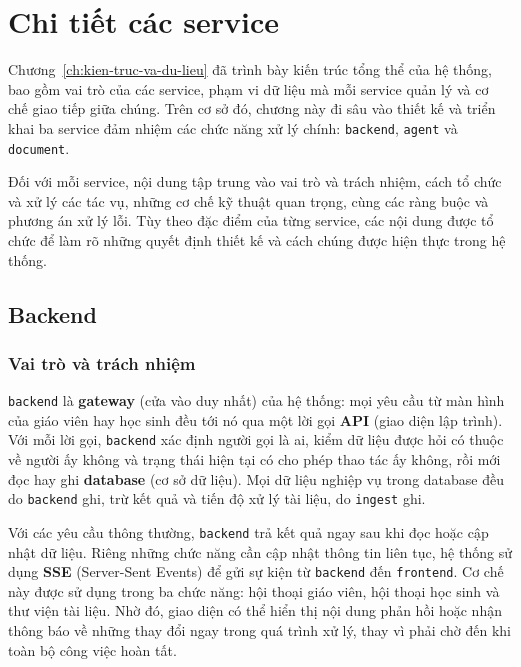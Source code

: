 \chapter{Chi tiết các service}
\label{ch:chi-tiet-cac-service}

Chương~\ref{ch:kien-truc-va-du-lieu} đã trình bày kiến trúc tổng thể của hệ thống, 
bao gồm vai trò của các service, phạm vi dữ liệu mà mỗi service quản lý và cơ chế 
giao tiếp giữa chúng. Trên cơ sở đó, chương này đi sâu vào thiết kế và triển khai 
ba service đảm nhiệm các chức năng xử lý chính: \texttt{backend}, \texttt{agent} và \texttt{document}.

Đối với mỗi service, nội dung tập trung vào vai trò và trách nhiệm, cách tổ chức 
và xử lý các tác vụ, những cơ chế kỹ thuật quan trọng, cùng các ràng buộc và 
phương án xử lý lỗi. Tùy theo đặc điểm của từng service, các nội dung được tổ 
chức để làm rõ những quyết định thiết kế và cách chúng được hiện thực trong hệ thống.

\section{Backend}
\label{sec:be}

\subsection{Vai trò và trách nhiệm}

\texttt{backend} là \textbf{gateway} (cửa vào duy nhất) của hệ thống: mọi yêu cầu từ màn hình của
giáo viên hay học sinh đều tới nó qua một lời gọi \textbf{API} (giao diện lập trình). Với mỗi lời gọi, 
\texttt{backend} xác định người gọi là ai, kiểm dữ liệu được hỏi có thuộc về người ấy không và trạng 
thái hiện tại có cho phép thao tác ấy không, rồi mới đọc hay ghi \textbf{database} (cơ sở dữ liệu). 
Mọi dữ liệu nghiệp vụ trong database đều do \texttt{backend} ghi, trừ kết quả và tiến độ xử lý tài liệu,
do \texttt{ingest} ghi.

Với các yêu cầu thông thường, \texttt{backend} trả kết quả ngay sau khi đọc hoặc cập nhật dữ liệu. 
Riêng những chức năng cần cập nhật thông tin liên tục, hệ thống sử dụng \textbf{SSE} (Server-Sent Events) 
để gửi sự kiện từ \texttt{backend} đến \texttt{frontend}. Cơ chế này được sử dụng trong ba chức năng: 
hội thoại giáo viên, hội thoại học sinh và thư viện tài liệu. Nhờ đó, giao diện có thể hiển thị nội dung 
phản hồi hoặc nhận thông báo về những thay đổi ngay trong quá trình xử lý, thay vì phải chờ đến khi 
toàn bộ công việc hoàn tất.

